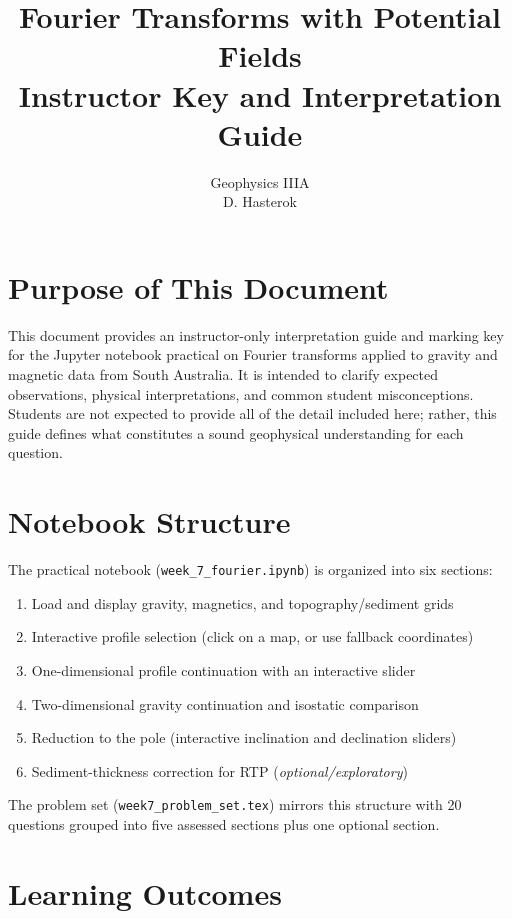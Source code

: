 \documentclass[11pt]{article}
\title{Fourier Transforms with Potential Fields \\
Instructor Key and Interpretation Guide}
\author{Geophysics IIIA \\ D. Hasterok}
\date{}
\begin{document}
\maketitle

\section*{Purpose of This Document}

This document provides an instructor-only interpretation guide and marking key for
the Jupyter notebook practical on Fourier transforms applied to gravity and magnetic
data from South Australia.  It is intended to clarify expected observations, physical
interpretations, and common student misconceptions.  Students are not expected to
provide all of the detail included here; rather, this guide defines what constitutes
a sound geophysical understanding for each question.

\section*{Notebook Structure}

The practical notebook (\texttt{week\_7\_fourier.ipynb}) is organized into six
sections:
\begin{enumerate}
  \item Load and display gravity, magnetics, and topography/sediment grids
  \item Interactive profile selection (click on a map, or use fallback coordinates)
  \item One-dimensional profile continuation with an interactive slider
  \item Two-dimensional gravity continuation and isostatic comparison
  \item Reduction to the pole (interactive inclination and declination sliders)
  \item Sediment-thickness correction for RTP (\emph{optional/exploratory})
\end{enumerate}
The problem set (\texttt{week7\_problem\_set.tex}) mirrors this structure with 20
questions grouped into five assessed sections plus one optional section.

\section*{Learning Outcomes}
\end{document}
